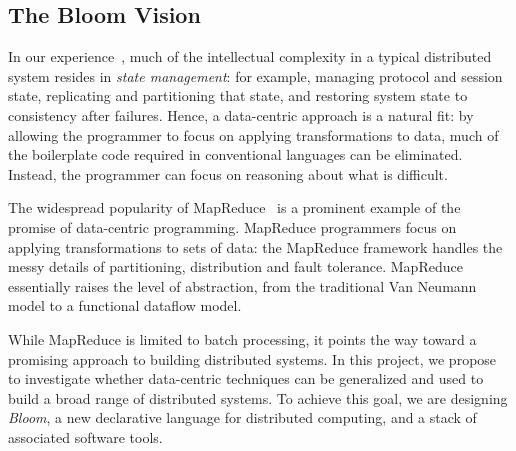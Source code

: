 \subsection{The Bloom Vision}
In our experience~\cite{netdb, boom-eurosys}, much of the intellectual
complexity in a typical distributed system resides in \emph{state
  management}: for example, managing protocol and session state, replicating and
  partitioning that state, and restoring system state to consistency after
  failures. Hence, a data-centric approach is a
natural fit: by allowing the programmer to focus on applying
transformations to data, much of the boilerplate code required in
conventional languages can be eliminated. Instead, the programmer can
focus on reasoning about what is difficult.

The widespread popularity of MapReduce~\cite{mapreduce-osdi} is a
prominent example of the promise of data-centric
programming. MapReduce programmers focus on applying transformations
to sets of data: the MapReduce framework handles the messy details of
partitioning, distribution and fault tolerance. MapReduce essentially
raises the level of abstraction, from the traditional Van Neumann
model to a functional dataflow model.

While MapReduce is limited to batch processing, it points the way
toward a promising approach to building distributed systems. In this
project, we propose to investigate whether data-centric techniques can
be generalized and used to build a broad range of distributed
systems. 
To achieve this goal, we are designing \emph{Bloom}, a new
declarative language for distributed computing, and a stack of
associated software tools.
